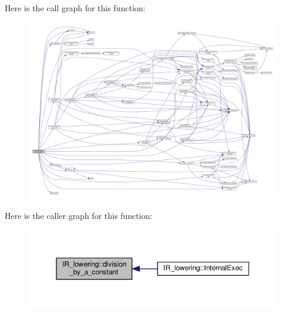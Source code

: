 Here is the call graph for this function\+:
\nopagebreak
\begin{figure}[H]
\begin{center}
\leavevmode
\includegraphics[width=350pt]{df/d7d/classIR__lowering_ad68af9b9031624406acd7557e3e30c9f_cgraph}
\end{center}
\end{figure}
Here is the caller graph for this function\+:
\nopagebreak
\begin{figure}[H]
\begin{center}
\leavevmode
\includegraphics[width=350pt]{df/d7d/classIR__lowering_ad68af9b9031624406acd7557e3e30c9f_icgraph}
\end{center}
\end{figure}
\mbox{\label{classIR__lowering_a00b8351a51bd62d131105fc1098bd0f7}} 
